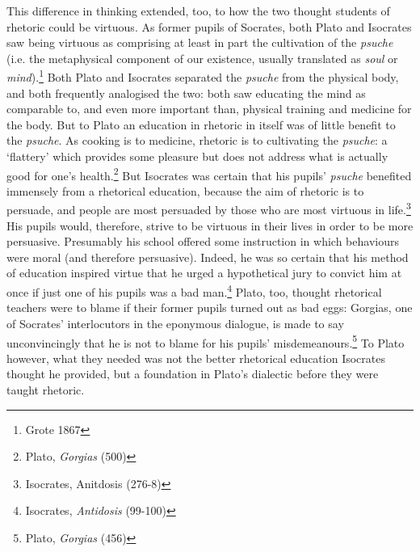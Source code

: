 \begin{multicols}{2}
This difference in thinking extended, too, to how the two thought
students of rhetoric could be virtuous. As former pupils of Socrates,
both Plato and Isocrates saw being virtuous as comprising at least in
part the cultivation of the \emph{psuche }(i.e. the metaphysical
component of our existence, usually translated as \emph{soul} or
\emph{mind}).\footnote{\textsuperscript{} Grote 1867} Both Plato and
Isocrates separated the \emph{psuche} from the physical body, and both
frequently analogised the two: both saw educating the mind as comparable
to, and even more important than, physical training and medicine for the
body. But to Plato an education in rhetoric in itself was of little
benefit to the \emph{psuche}. As cooking is to medicine, rhetoric is to
cultivating the \emph{psuche}: a `flattery' which provides some pleasure
but does not address what is actually good for one's health.\footnote{\textsuperscript{}
	Plato, \emph{Gorgias} (500)} But Isocrates was certain that his
pupils' \emph{psuche }benefited immensely from a rhetorical education,
because the aim of rhetoric is to persuade, and people are most
persuaded by those who are most virtuous in life.\footnote{\textsuperscript{}
	Isocrates, Anitdosis (276-8)} His pupils would, therefore, strive to
be virtuous in their lives in order to be more persuasive. Presumably
his school offered some instruction in which behaviours were moral (and
therefore persuasive). Indeed, he was so certain that his method of
education inspired virtue that he urged a hypothetical jury to convict
him at once if just one of his pupils was a bad man.\footnote{\textsuperscript{}
	Isocrates, \emph{Antidosis} (99-100)} Plato, too, thought rhetorical
teachers were to blame if their former pupils turned out as bad eggs:
Gorgias, one of Socrates' interlocutors in the eponymous dialogue, is
made to say unconvincingly that he is not to blame for his pupils'
misdemeanours.\footnote{\textsuperscript{} Plato, \emph{Gorgias} (456)}
To Plato however, what they needed was not the better rhetorical
education Isocrates thought he provided, but a foundation in Plato's
dialectic before they were taught rhetoric.


\end{multicols}
